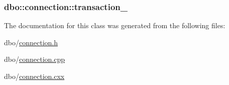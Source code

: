 \hypertarget{classdbo_1_1connection_a7d822f46486566b7e6b310a581e6a148}{
\subsubsection[{transaction\+\_\+}]{ dbo\+::connection\+::transaction\+\_\+\hspace{0.3cm}{\ttfamily [protected]}}}\label{classdbo_1_1connection_a7d822f46486566b7e6b310a581e6a148}


The documentation for this class was generated from the following files\+:\begin{DoxyCompactItemize}
\item 
dbo/\hyperlink{connection_8h}{connection.\+h}\item 
dbo/\hyperlink{connection_8cpp}{connection.\+cpp}\item 
dbo/\hyperlink{connection_8cxx}{connection.\+cxx}\end{DoxyCompactItemize}
